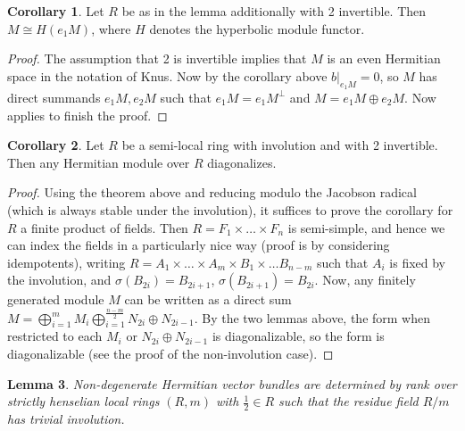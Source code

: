 \documentclass[edeposit,fullpage]{uiucthesis2009}
\theoremstyle{plain}
\newtheorem{lemma}{Lemma}
\numberwithin{lemma}{section}
\theoremstyle{definition}
\newtheorem{corollary}[lemma]{Corollary}
\begin{document}
\begin{corollary} \label{HermFormsOverSwitch} 
Let $R$ be as in the lemma additionally with 2 invertible. Then $M \cong H(e_1M)$, where $H$ denotes
the hyperbolic module functor. 
\end{corollary}

\begin{proof}
The assumption that 2 is invertible implies that $M$ is an even
Hermitian space in the notation of Knus. Now by the corollary above
$b|_{e_1M} = 0$, so $M$ has direct summands $e_1M, e_2M$ such that $e_1M =
e_1M^{\perp}$ and $M = e_1 M \oplus e_2M$. Now \cite[Corollary 3.7.3]{HermKnus} applies to finish the proof.
\end{proof}

\begin{corollary}\label{cor:herm_diag}
Let $R$ be a semi-local ring with involution and with 2 invertible. Then any Hermitian
module over $R$ diagonalizes.
\end{corollary}

\begin{proof}
Using the theorem above and reducing modulo the Jacobson radical
(which is always stable under the involution), it
suffices to prove the corollary for $R$ a finite product of
fields. Then $R = F_1 \times \dots \times F_n$ is semi-simple, and
hence we can index the fields in a particularly nice way (proof is by
considering idempotents), writing $R = A_1 \times \dots \times A_m \times B_1 \times
\dots B_{n-m}$ such that $A_i$ is fixed by the involution, and
$\sigma(B_{2i}) = B_{2i+1}$, $\sigma(B_{2i+1}) = B_{2i}$. Now, any
finitely generated module $M$ can be written as a direct sum $M =
\bigoplus_{i=1}^m M_i \bigoplus_{i=1}^{\frac{n-m}{2}} N_{2i} \oplus
N_{2i-1}$. By the two lemmas above, the form when restricted to each
$M_i$ or $N_{2i} \oplus N_{2i-1}$ is diagonalizable, so the form is
diagonalizable (see the proof of the non-involution case).   
\end{proof}


\begin{lemma}\label{lem:semiloc_herm_form_rank}
Non-degenerate Hermitian vector bundles are determined by rank over strictly
henselian local rings $(R,m)$ with $\frac{1}{2} \in R$ such that the residue field $R/m$ has
trivial involution.
\end{lemma}
\end{document}

